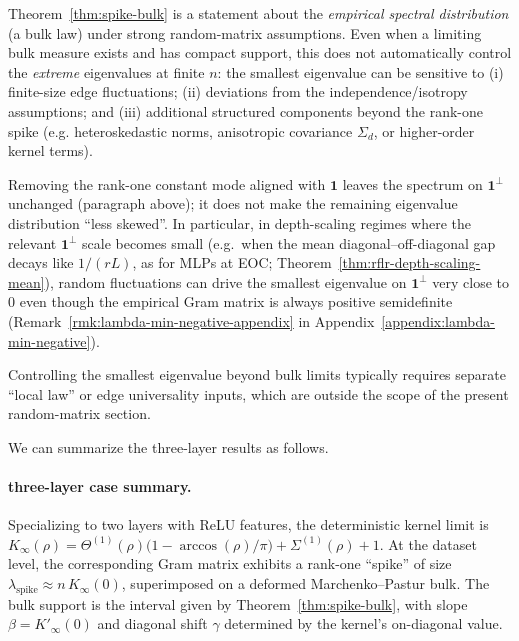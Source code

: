 \begin{remark}\label{rmk:bulk-vs-extremes}
Theorem~\ref{thm:spike-bulk} is a statement about the \emph{empirical spectral distribution} (a bulk law) under strong random-matrix assumptions. Even when a limiting bulk measure exists and has compact support, this does not automatically control the \emph{extreme} eigenvalues at finite \(n\): the smallest eigenvalue can be sensitive to (i) finite-size edge fluctuations; (ii) deviations from the independence/isotropy assumptions; and (iii) additional structured components beyond the rank-one spike (e.g. heteroskedastic norms, anisotropic covariance \(\Sigma_d\), or higher-order kernel terms).

Removing the rank-one constant mode aligned with \(\mathbf{1}\) leaves the spectrum on \(\mathbf{1}^\perp\) unchanged (paragraph above); it does not make the remaining eigenvalue distribution ``less skewed''. In particular, in depth-scaling regimes where the relevant \(\mathbf{1}^\perp\) scale becomes small (e.g.\ when the mean diagonal--off-diagonal gap decays like \(1/(rL)\), as for MLPs at EOC; Theorem~\ref{thm:rflr-depth-scaling-mean}), random fluctuations can drive the smallest eigenvalue on \(\mathbf{1}^\perp\) very close to \(0\) even though the empirical Gram matrix is always positive semidefinite (Remark~\ref{rmk:lambda-min-negative-appendix} in Appendix~\ref{appendix:lambda-min-negative}).

Controlling the smallest eigenvalue beyond bulk limits typically requires separate ``local law'' or edge universality inputs, which are outside the scope of the present random-matrix section.
\end{remark}

We can summarize the three-layer results as follows.

\paragraph{three-layer case summary.}
Specializing to two layers with ReLU features, the deterministic kernel limit is
\( K_{\infty}(\rho) = \Theta^{(1)}(\rho)\big(1-\arccos(\rho)/\pi\big) + \Sigma^{(1)}(\rho) + 1 \).
At the dataset level, the corresponding Gram matrix exhibits a rank-one ``spike'' of size
\( \lambda_{\mathrm{spike}} \approx n\,K_{\infty}(0) \), superimposed on a deformed Marchenko–Pastur bulk.
The bulk support is the interval given by Theorem~\ref{thm:spike-bulk}, with slope
\( \beta = K'_{\infty}(0) \) and diagonal shift \( \gamma \) determined by the kernel's on-diagonal value.
